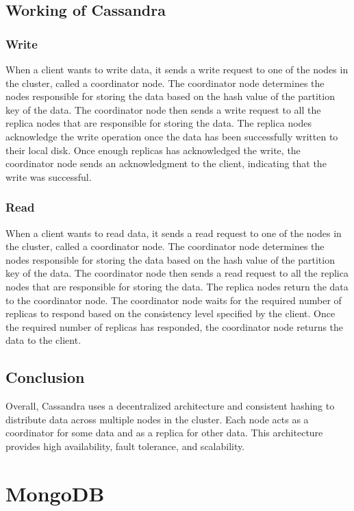 \documentclass[12pt]{article}
\begin{document}
\subsection{Working of Cassandra}
  \subsubsection{Write}
  When a client wants to write data, it sends a write request to one of the nodes in the cluster, called a coordinator node. The coordinator node determines the nodes responsible for storing the data based on the hash value of the partition key of the data. The coordinator node then sends a write request to all the replica nodes that are responsible for storing the data. The replica nodes acknowledge the write operation once the data has been successfully written to their local disk. Once enough replicas has acknowledged the write, the coordinator node sends an acknowledgment to the client, indicating that the write was successful.
  \subsubsection{Read}
  When a client wants to read data, it sends a read request to one of the nodes in the cluster, called a coordinator node. The coordinator node determines the nodes responsible for storing the data based on the hash value of the partition key of the data. The coordinator node then sends a read request to all the replica nodes that are responsible for storing the data. The replica nodes return the data to the coordinator node. The coordinator node waits for the required number of replicas to respond based on the consistency level specified by the client. Once the required number of replicas has responded, the coordinator node returns the data to the client.
\subsection{Conclusion}
Overall, Cassandra uses a decentralized architecture and consistent hashing to distribute data across multiple nodes in the cluster. Each node acts as a
coordinator for some data and as a replica for other data. This architecture provides high availability, fault tolerance, and scalability.
  \pagebreak
\section{MongoDB}
\end{document}
